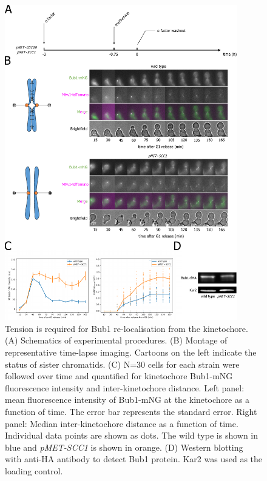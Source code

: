 \begin{figure}[htbp]
  \centering
  \includegraphics[width=0.9\textwidth]{chapter3/figures/Bub1-mNG pMET-SCC1.pdf}
  \caption[Tension is required for Bub1 re-localisation from the kinetochore]{Tension is required for Bub1 re-localisation from the kinetochore. (A) Schematics of experimental procedures. (B) Montage of representative time-lapse imaging. Cartoons on the left indicate the status of sister chromatids. (C) N=30 cells for each strain were followed over time and quantified for kinetochore Bub1-mNG fluorescence intensity and inter-kinetochore distance. Left panel: mean fluorescence intensity of Bub1-mNG at the kinetochore as a function of time. The error bar represents the standard error. Right panel: Median inter-kinetochore distance as a function of time. Individual data points are shown as dots. The wild type is shown in blue and \textit{pMET-SCC1} is shown in orange. (D) Western blotting with anti-HA antibody to detect Bub1 protein. Kar2 was used as the loading control. }
  \label{fig:bub1metscc1}
\end{figure} 


